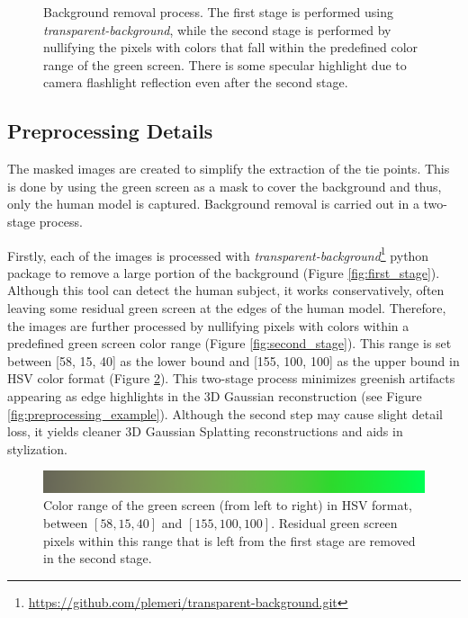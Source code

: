 \begin{figure}[h]
\begin{subfigure}{0.2\linewidth}
	\end{subfigure}
	\caption{Background removal process. The first stage is performed using \textit{transparent-background}, while the second stage is performed by nullifying the pixels with colors that fall within the predefined color range of the green screen. There is some specular highlight due to camera flashlight reflection even after the second stage.}
	\label{fig:bg_remove}
\end{figure}

\subsection{Preprocessing Details}
The masked images are created to simplify the extraction of the tie points. This is done by using the green screen as a mask to cover the background and thus, only the human model is captured. Background removal is carried out in a two-stage process.

Firstly, each of the images is processed with \textit{transparent-background}\footnote{\url{https://github.com/plemeri/transparent-background.git}} python package \citep{Kim.2022} to remove a large portion of the background (Figure \ref{fig:first_stage}). Although this tool can detect the human subject, it works conservatively, often leaving some residual green screen at the edges of the human model. Therefore, the images are further processed by nullifying pixels with colors within a predefined green screen color range (Figure \ref{fig:second_stage}). This range is set between [58, 15, 40] as the lower bound and [155, 100, 100] as the upper bound in HSV color format (Figure \ref{fig:color_range}). This two-stage process minimizes greenish artifacts appearing as edge highlights in the 3D Gaussian reconstruction (see Figure \ref{fig:preprocessing_example}). Although the second step may cause slight detail loss, it yields cleaner 3D Gaussian Splatting reconstructions and aids in stylization.


\begin{figure}
	\includegraphics[width=\textwidth]{Figures/processed/green.png}
	\caption{Color range of the green screen (from left to right) in HSV format, between  $[58, 15, 40]$ and $[155, 100, 100]$. Residual green screen pixels within this range that is left from the first stage are removed in the second stage.}
	\label{fig:color_range}
\end{figure}


